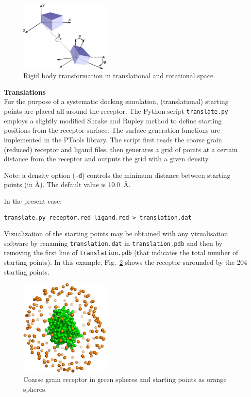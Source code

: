 \documentclass[12pt,a4paper]{article}
\begin{document}
\begin{figure}[!htbp]
\center
\includegraphics*[width=0.4\textwidth]{img/rigid_body_freedom.png}
\caption{Rigid body transformation in translational and rotational space.}
\label{rigid_body}
\end{figure}

\textbf{Translations}\\
For the purpose of a systematic docking simulation, (translational) 
starting points are placed  all around the receptor. The Python script {\tt translate.py} employs a slightly modified Shrake and Rupley \cite{Shrake1973} method to define starting positions from the receptor surface. The surface generation functions are implemented in the PTools library. The script first reads the coarse grain (reduced) receptor and ligand files, then generates a grid of points at a certain distance from the receptor and outputs the grid with a given density.

Note: a density option ({\tt -d}) controls the minimum distance between starting points (in \AA). The default value is 10.0~\AA. 

In the present case:
\begin{verbatim}
translate.py receptor.red ligand.red > translation.dat
\end{verbatim}

Vizualization of the starting points may be obtained with any vizualisation 
software by renaming {\tt translation.dat} in {\tt translation.pdb} and then
by removing the first line of {\tt translation.pdb} (that indicates the total 
number of starting points). In this example, Fig.~\ref{1CGI_translation} shows the receptor surounded by the 204 starting points.

\begin{figure}[htbp]
\center
\includegraphics*[width=0.4\textwidth]{img/1CGI_translation.png}
\caption{Coarse grain receptor in green spheres and starting points as orange spheres.}
\label{1CGI_translation}
\end{figure}
\end{document}
